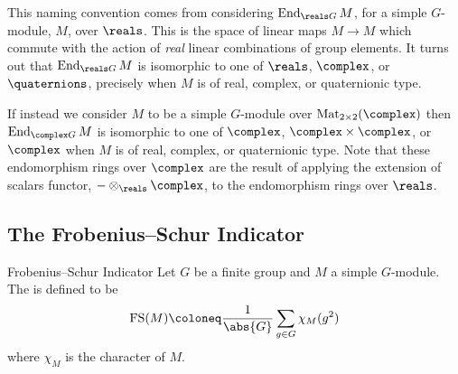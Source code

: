 \documentclass[fleqn]{NotesClass}
\DeclareMathOperator{\End}{End}
\DeclareMathOperator{\Mat}{Mat}
\DeclareMathOperator{\frobeniusSchur}{FS}
\begin{document}
    This naming convention comes from considering \(\End_{\reals G}M\), for a simple \(G\)-module, \(M\), over \(\reals\).
    This is the space of linear maps \(M \to M\) which commute with the action of \emph{real} linear combinations of group elements.
    It turns out that \(\End_{\reals G}M\) is isomorphic to one of \(\reals\), \(\complex\), or \(\quaternions\), precisely when \(M\) is of real, complex, or quaternionic type.
    
    If instead we consider \(M\) to be a simple \(G\)-module over \(\Mat_{2 \times 2}(\complex)\) then \(\End_{\complex G}M\) is isomorphic to one of \(\complex\), \(\complex \times \complex\), or \(\complex\) when \(M\) is of real, complex, or quaternionic type.
    Note that these endomorphism rings over \(\complex\) are the result of applying the extension of scalars functor, \({-} \otimes_{\reals} \complex\), to the endomorphism rings over \(\reals\).
    
    \subsection{The Frobenius--Schur Indicator}
    \begin{dfn}{Frobenius--Schur Indicator}{}
        Let \(G\) be a finite group and \(M\) a simple \(G\)-module.
        The  is defined to be
        \begin{equation}
            \frobeniusSchur(M) \coloneq \frac{1}{\abs{G}} \sum_{g \in G} \chi_M(g^2)
        \end{equation}
        where \(\chi_M\) is the character of \(M\).
    \end{dfn}
    
\end{document}
